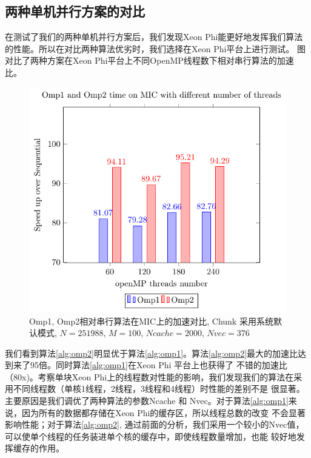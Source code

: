 \subsection{两种单机并行方案的对比} %
\label{sub:compareV1V2}

在测试了我们的两种单机并行方案后，我们发现Xeon Phi能更好地发挥我们算法的性能。所以在对比两种算法优劣时，我们选择在Xeon Phi平台上进行测试。
图\label{fig:compareV1V2}对比了两种方案在Xeon Phi平台上不同OpenMP线程数下相对串行算法的加速比。
\begin{figure}[!t]
   \centering
   \includegraphics[width=\textwidth]{chap5/Figures/BS-Core-bar.pdf}
   \caption{Omp1, Omp2相对串行算法在MIC上的加速对比, Chunk 采用系统默认模式, $N=251988$, $M=100$, $Ncache=2000$, $Nvec=376$}
   \label{fig:compareV1V2}
\end{figure}
我们看到算法\ref{alg:omp2}明显优于算法\ref{alg:omp1}。算法\ref{alg:omp2}最大的加速比达到来了95倍。同时算法\ref{alg:omp1}在Xeon Phi 平台上也获得了
不错的加速比（80x)。考察单块Xeon Phi上的线程数对性能的影响，我们发现我们的算法在采用不同线程数（单核1线程，2线程，3线程和4线程）时性能的差别不是
很显著。主要原因是我们调优了两种算法的参数Ncache 和 Nvec。对于算法\ref{alg:omp1}来说，因为所有的数据都存储在Xeon Phi的缓存区，所以线程总数的改变
不会显著影响性能；对于算法\ref{alg:omp2}, 通过前面的分析，我们采用一个较小的Nvec值，可以使单个线程的任务装进单个核的缓存中，即使线程数量增加，也能
较好地发挥缓存的作用。

